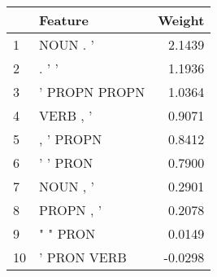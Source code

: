 \begin{tabular}{llr}
\toprule
{} &        Feature &  Weight \\
\midrule
1  &       NOUN . ' &  2.1439 \\
2  &          . ' ' &  1.1936 \\
3  &  ' PROPN PROPN &  1.0364 \\
4  &       VERB , ' &  0.9071 \\
5  &      , ' PROPN &  0.8412 \\
6  &       ' ' PRON &  0.7900 \\
7  &       NOUN , ' &  0.2901 \\
8  &      PROPN , ' &  0.2078 \\
9  &       " " PRON &  0.0149 \\
10 &    ' PRON VERB & -0.0298 \\
\bottomrule
\end{tabular}
